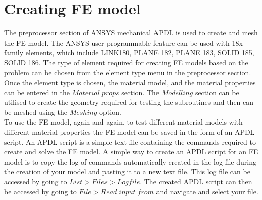 \documentclass[12pt,twoside]{report}
\begin{document}
\section{Creating FE model}
\indent\indent\indent  The preprocessor section of ANSYS mechanical APDL is used to create and mesh the FE model. The ANSYS user-programmable feature can be used with 18x family elements, which include LINK180, PLANE 182, PLANE 183, SOLID 185, SOLID 186. The type of element required for creating FE models based on the problem can be chosen from the element type menu in the preprocessor section. Once the element type is chosen, the material model, and the material properties can be entered in the $Material\; props$ section.  The $Modelling$ section can be utilised to create the geometry required for testing the subroutines and then can be meshed using the $Meshing$ option.\\ \indent\indent\indent To use the FE model, again and again, to test different material models with different material properties the FE model can be saved in the form of an APDL script.  An APDL script is a simple text file containing the commands required to create and solve the FE model. A simple way to create an APDL script for an FE model is to copy the log of commands automatically created in the log file during the creation of your model and pasting it to a new text file. This log file can be accessed by going to $List>Files>Logfile$. The created APDL script can then be accessed by going to $File>Read \;input\; from$ and navigate and select your file.
\end{document}
